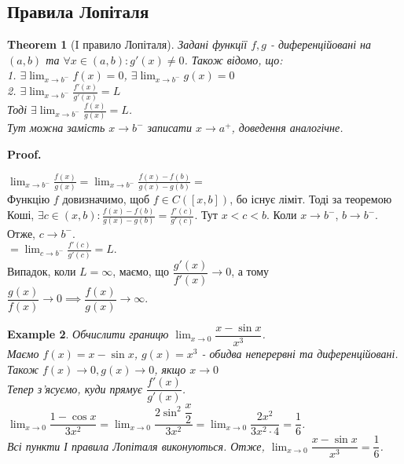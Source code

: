 \documentclass[a4paper, 14pt]{article}
\makeatletter
\def\qed{$\blacksquare$}
\theoremstyle{theoremdd}
\newtheorem{theorem}{Theorem}[subsection]
\theoremstyle{theoremdd}
\theoremstyle{theoremdd}
\theoremstyle{theoremdd}
\newtheorem{example}[theorem]{Example}
\theoremstyle{theoremdd}
\theoremstyle{theoremdd}
\theoremstyle{theoremdd}
\theoremstyle{theoremdd}
\renewenvironment{proof}[1][Proof.\\]{\par
\pushQED{\hfill \qed}%
\normalfont \topsep6\p@\@plus6\p@\relax
\trivlist
\item\relax
{\bfseries
#1\@addpunct{.}}\hspace\labelsep\ignorespaces
}{%
\popQED\endtrivlist\@endpefalse
}
\makeatother
\begin{document}
\subsection{Правила Лопіталя}
\begin{theorem}[I правило Лопіталя]
Задані функції $f,g$ - диференційовані на $(a,b)$ та $\forall x \in (a,b): g'(x) \neq 0$. Також відомо, що:\\
1. $\exists \displaystyle \lim_{x \to b^-} f(x) = 0$, $\exists \displaystyle \lim_{x \to b^-} g(x) = 0$\\
2. $\exists \displaystyle \lim_{x \to b^-} \frac{f'(x)}{g'(x)} = L$\\
Тоді $\exists \displaystyle \lim_{x \to b^-} \frac{f(x)}{g(x)} = L$.\\
\textit{Тут можна замість $x \to b^-$ записати $x \to a^+$, доведення аналогічне.}
\end{theorem}

\begin{proof}
$\displaystyle \lim_{x \to b^-} \frac{f(x)}{g(x)} = \lim_{x \to b^-} \frac{f(x)-f(b)}{g(x)-g(b)} \boxed{=}$\\
Функцію $f$ довизначимо, щоб $f \in C([x,b])$, бо існує ліміт. Тоді за теоремою Коші, $\exists c \in (x, b): \displaystyle \frac{f(x)-f(b)}{g(x)-g(b)} = \frac{f'(c)}{g'(c)}$. Тут $x < c < b$. Коли $x \to b^-$, $b \to b^-$. Отже, $c \to b^-$.\\
$\boxed{=} \displaystyle \lim_{c \to b^-} \frac{f'(c)}{g'(c)} = L$.
\bigskip \\
Випадок, коли $L = \infty$, маємо, що $\dfrac{g'(x)}{f'(x)} \to 0$, а тому $\dfrac{g(x)}{f(x)} \to 0 \implies \dfrac{f(x)}{g(x)} \to \infty$.
\end{proof}

\begin{example}
Обчислити границю $\displaystyle\lim_{x \to 0} \dfrac{x-\sin x}{x^3}$.\\
Маємо $f(x) = x - \sin x$, $g(x) = x^3$ - обидва неперервні та диференційовані. Також $f(x) \to 0, g(x) \to 0$, якщо $x \to 0$\\
Тепер з'ясуємо, куди прямує $\dfrac{f'(x)}{g'(x)}$.\\
$\displaystyle\lim_{x \to 0} \dfrac{1-\cos x}{3x^2} = \lim_{x \to 0} \dfrac{2 \sin^2 \dfrac{x}{2}}{3x^2} = \displaystyle\lim_{x \to 0} \dfrac{2x^2}{3x^2 \cdot 4} = \dfrac{1}{6}$.\\
Всі пункти І правила Лопіталя виконуються. Отже, $\displaystyle\lim_{x \to 0} \dfrac{x-\sin x}{x^3} = \dfrac{1}{6}$.
\end{example}
\end{document}

